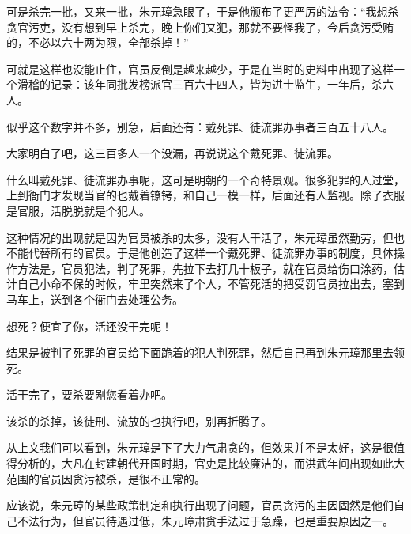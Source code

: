 \begin{multicols}{\theparacolNo}
		可是杀完一批，又来一批，朱元璋急眼了，于是他颁布了更严厉的法令：“我想杀贪官污吏，没有想到早上杀完，晚上你们又犯，那就不要怪我了，今后贪污受贿的，不必以六十两为限，全部杀掉！”

		可就是这样也没能止住，官员反倒是越来越少，于是在当时的史料中出现了这样一个滑稽的记录：该年同批发榜派官三百六十四人，皆为进士监生，一年后，杀六人。

		似乎这个数字并不多，别急，后面还有：戴死罪、徒流罪办事者三百五十八人。

		大家明白了吧，这三百多人一个没漏，再说说这个戴死罪、徒流罪。

		什么叫戴死罪、徒流罪办事呢，这可是明朝的一个奇特景观。很多犯罪的人过堂，上到衙门才发现当官的也戴着镣铐，和自己一模一样，后面还有人监视。除了衣服是官服，活脱脱就是个犯人。

		这种情况的出现就是因为官员被杀的太多，没有人干活了，朱元璋虽然勤劳，但也不能代替所有的官员。于是他创造了这样一个戴死罪、徒流罪办事的制度，具体操作方法是，官员犯法，判了死罪，先拉下去打几十板子，就在官员给伤口涂药，估计自己小命不保的时候，牢里突然来了个人，不管死活的把受罚官员拉出去，塞到马车上，送到各个衙门去处理公务。

		想死？便宜了你，活还没干完呢！

		结果是被判了死罪的官员给下面跪着的犯人判死罪，然后自己再到朱元璋那里去领死。

		活干完了，要杀要剐您看着办吧。

		该杀的杀掉，该徒刑、流放的也执行吧，别再折腾了。

		从上文我们可以看到，朱元璋是下了大力气肃贪的，但效果并不是太好，这是很值得分析的，大凡在封建朝代开国时期，官吏是比较廉洁的，而洪武年间出现如此大范围的官员因贪污被杀，是很不正常的。

		应该说，朱元璋的某些政策制定和执行出现了问题，官员贪污的主因固然是他们自己不法行为，但官员待遇过低，朱元璋肃贪手法过于急躁，也是重要原因之一。
		\ifnum{}
	\end{multicols}
\fi
\newpage
